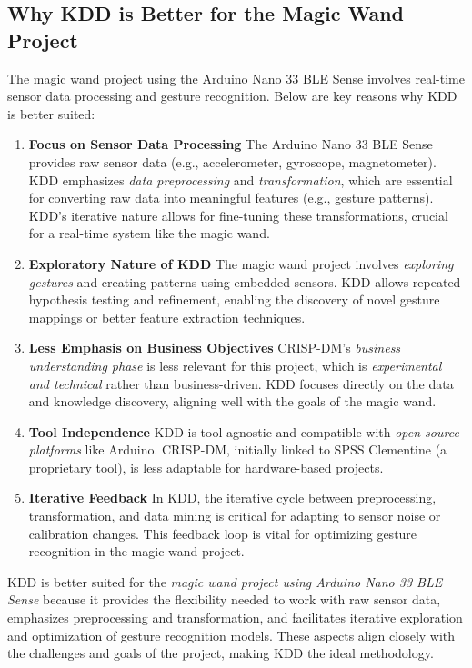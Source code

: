 \subsection{Why KDD is Better for the Magic Wand Project}
The magic wand project using the Arduino Nano 33 BLE Sense involves real-time sensor data processing and gesture recognition. Below are key reasons why KDD is better suited:

\begin{enumerate}
    \item \textbf{Focus on Sensor Data Processing} 
    The Arduino Nano 33 BLE Sense provides raw sensor data (e.g., accelerometer, gyroscope, magnetometer). KDD emphasizes \textit{data preprocessing} and \textit{transformation}, which are essential for converting raw data into meaningful features (e.g., gesture patterns). KDD's iterative nature allows for fine-tuning these transformations, crucial for a real-time system like the magic wand.

    \item \textbf{Exploratory Nature of KDD} 
    The magic wand project involves \textit{exploring gestures} and creating patterns using embedded sensors. KDD allows repeated hypothesis testing and refinement, enabling the discovery of novel gesture mappings or better feature extraction techniques.

    \item \textbf{Less Emphasis on Business Objectives} 
    CRISP-DM’s \textit{business understanding phase} is less relevant for this project, which is \textit{experimental and technical} rather than business-driven. KDD focuses directly on the data and knowledge discovery, aligning well with the goals of the magic wand.

    \item \textbf{Tool Independence} 
    KDD is tool-agnostic and compatible with \textit{open-source platforms} like Arduino. CRISP-DM, initially linked to SPSS Clementine (a proprietary tool), is less adaptable for hardware-based projects.

    \item \textbf{Iterative Feedback} 
    In KDD, the iterative cycle between preprocessing, transformation, and data mining is critical for adapting to sensor noise or calibration changes. This feedback loop is vital for optimizing gesture recognition in the magic wand project.
\end{enumerate}

KDD is better suited for the \textit{magic wand project using Arduino Nano 33 BLE Sense} because it provides the flexibility needed to work with raw sensor data, emphasizes preprocessing and transformation, and facilitates iterative exploration and optimization of gesture recognition models. These aspects align closely with the challenges and goals of the project, making KDD the ideal methodology.


